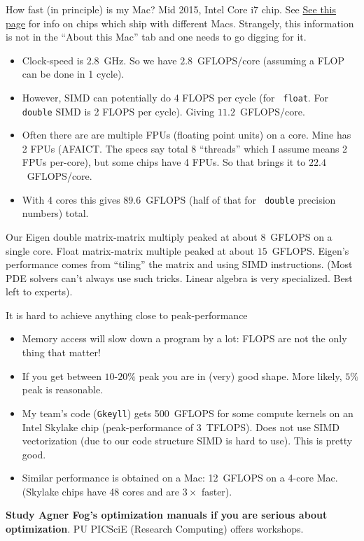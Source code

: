 \documentclass[aspectratio=169]{beamer}
\newcommand{\mypause}{\pause}
\begin{document}
\begin{frame}{How fast (in principle) is my Mac?}
  \footnotesize%
  Mid 2015, Intel Core i7 chip.  See
  \href{https://everymac.com/systems/apple/macbook_pro/specs/macbook-pro-core-i7-2.8-15-iris-only-mid-2015-retina-display-specs.html}{See
    this page} for info on chips which ship with different
  Macs. Strangely, this information is not in the ``About this Mac''
  tab and one needs to go digging for it.
  \begin{itemize}
  \item Clock-speed is $2.8$~GHz. So we have $2.8$~GFLOPS/core
    (assuming a FLOP can be done in 1 cycle).%
    \mypause%
  \item However, SIMD can potentially do 4 FLOPS per cycle (for {\tt
      float}. For {\tt double} SIMD is 2 FLOPS per cycle). Giving
    $11.2$~GFLOPS/core.%
    \mypause%
  \item Often there are are multiple FPUs (floating point units) on a
    core. Mine has 2 FPUs (AFAICT. The specs say total 8 ``threads''
    which I assume means 2 FPUs per-core), but some chips have 4
    FPUs. So that brings it to $22.4$~GFLOPS/core.
  \item With 4 cores this gives $89.6$~GFLOPS (half of that for {\tt
      double} precision numbers) total.
  \end{itemize}
  Our Eigen double matrix-matrix multiply peaked at about $8$~GFLOPS
  on a single core. Float matrix-matrix multiple peaked at about
  $15$~GFLOPS.%
  \mypause%
  \vskip0.1in%
  Eigen's performance comes from ``tiling'' the matrix and using SIMD
  instructions. (Most PDE solvers can't always use such tricks. Linear
  algebra is very specialized. Best left to experts). 
\end{frame}

\begin{frame}{It is hard to achieve anything close to
    peak-performance}
  \begin{itemize}
  \item Memory access will slow down a program by a lot: FLOPS are not
    the only thing that matter!
  \item If you get between $10$-$20\%$ peak you are in (very) good
    shape. More likely, $5\%$ peak is reasonable.
  \item My team's code ({\tt Gkeyll}) gets 500~GFLOPS for some compute
    kernels on an Intel Skylake chip (peak-performance of
    3~TFLOPS). Does not use SIMD vectorization (due to our code
    structure SIMD is hard to use). This is pretty good.
  \item Similar performance is obtained on a Mac: 12~GFLOPS on a
    4-core Mac. (Skylake chips have 48 cores and are $3\times$
    faster).
  \end{itemize}
  {\bf Study Agner Fog's optimization manuals if you are serious about
    optimization}. PU PICSciE (Research Computing) offers workshops.
\end{frame}
\end{document}
